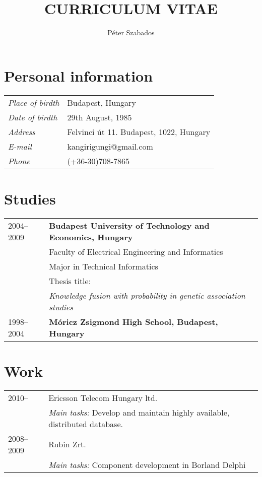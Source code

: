 \documentclass[a4paper,10pt]{article}
\title{\textbf{CURRICULUM VITAE}}
\author{Péter Szabados}
\newcommand{\pont}[1]{\emph{#1}}
\begin{document}
\maketitle

\section*{Personal information}
\begin{tabular}{ll}
 \pont{Place of birdth}&Budapest, Hungary\\
 \pont{Date of birdth}&29th August, 1985\\
 \pont{Address}&Felvinci út 11. Budapest, 1022, Hungary\\
 \pont{E-mail}&kangirigungi@gmail.com\\
 \pont{Phone}&(+36-30)708-7865\\
\end{tabular}

\section*{Studies}
\begin{tabular}{ll}
 2004--2009
  &\textbf{Budapest University of Technology and Economics, Hungary}\\
  &Faculty of Electrical Engineering and Informatics\\
  &Major in Technical Informatics\\
  &Thesis title:\\
  &\emph{Knowledge fusion with probability in genetic association studies}\\
  1998--2004&\textbf{Móricz Zsigmond High School, Budapest, Hungary}
\end{tabular}

\section*{Work}
\begin{tabular}{ll}
 2010--&Ericsson Telecom Hungary ltd.\\
  &\emph{Main tasks:} Develop and maintain highly available, distributed database.\\
 2008--2009&Rubin Zrt.\\
  &\emph{Main tasks:} Component development in Borland Delphi
\end{tabular}
\end{document}
